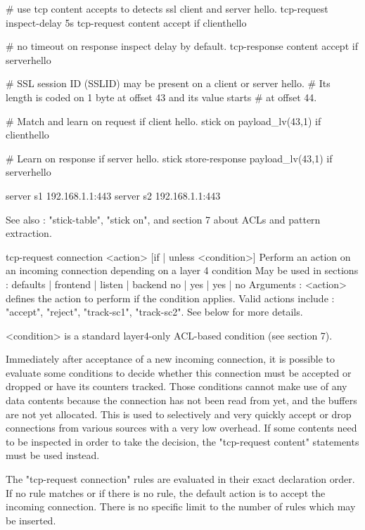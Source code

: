         # use tcp content accepts to detects ssl client and server hello.
        tcp-request inspect-delay 5s
        tcp-request content accept if clienthello

        # no timeout on response inspect delay by default.
        tcp-response content accept if serverhello

        # SSL session ID (SSLID) may be present on a client or server hello.
        # Its length is coded on 1 byte at offset 43 and its value starts
        # at offset 44.

        # Match and learn on request if client hello.
        stick on payload_lv(43,1) if clienthello

        # Learn on response if server hello.
        stick store-response payload_lv(43,1) if serverhello

        server s1 192.168.1.1:443
        server s2 192.168.1.1:443

  See also : "stick-table", "stick on", and section 7 about ACLs and pattern
             extraction.


tcp-request connection <action> [{if | unless} <condition>]
  Perform an action on an incoming connection depending on a layer 4 condition
  May be used in sections :   defaults | frontend | listen | backend
                                 no    |    yes   |   yes  |   no
  Arguments :
    <action>    defines the action to perform if the condition applies. Valid
                actions include : "accept", "reject", "track-sc1", "track-sc2".
                See below for more details.

    <condition> is a standard layer4-only ACL-based condition (see section 7).

  Immediately after acceptance of a new incoming connection, it is possible to
  evaluate some conditions to decide whether this connection must be accepted
  or dropped or have its counters tracked. Those conditions cannot make use of
  any data contents because the connection has not been read from yet, and the
  buffers are not yet allocated. This is used to selectively and very quickly
  accept or drop connections from various sources with a very low overhead. If
  some contents need to be inspected in order to take the decision, the
  "tcp-request content" statements must be used instead.

  The "tcp-request connection" rules are evaluated in their exact declaration
  order. If no rule matches or if there is no rule, the default action is to
  accept the incoming connection. There is no specific limit to the number of
  rules which may be inserted.

